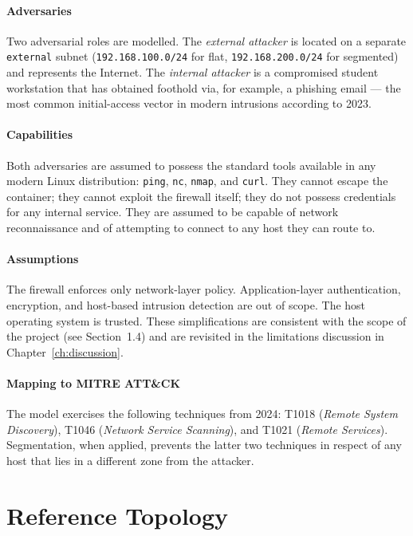 \paragraph{Adversaries} Two adversarial roles are modelled. The \emph{external attacker} is located on a separate \texttt{external} subnet (\texttt{192.168.100.0/24} for flat, \texttt{192.168.200.0/24} for segmented) and represents the Internet. The \emph{internal attacker} is a compromised student workstation that has obtained foothold via, for example, a phishing email --- the most common initial-access vector in modern intrusions according to \textcite{Verizon}{2023}.

\paragraph{Capabilities} Both adversaries are assumed to possess the standard tools available in any modern Linux distribution: \texttt{ping}, \texttt{nc}, \texttt{nmap}, and \texttt{curl}. They cannot escape the container; they cannot exploit the firewall itself; they do not possess credentials for any internal service. They are assumed to be capable of network reconnaissance and of attempting to connect to any host they can route to.

\paragraph{Assumptions} The firewall enforces only network-layer policy. Application-layer authentication, encryption, and host-based intrusion detection are out of scope. The host operating system is trusted. These simplifications are consistent with the scope of the project (see Section~1.4) and are revisited in the limitations discussion in Chapter~\ref{ch:discussion}.

\paragraph{Mapping to MITRE ATT\&CK} The model exercises the following techniques from \textcite{MITRE}{2024}: T1018 (\textit{Remote System Discovery}), T1046 (\textit{Network Service Scanning}), and T1021 (\textit{Remote Services}). Segmentation, when applied, prevents the latter two techniques in respect of any host that lies in a different zone from the attacker.

\section{Reference Topology}
\label{sec:topology}

